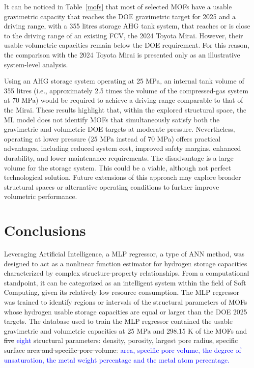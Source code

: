 \documentclass[review]{elsarticle}
\begin{document}
It can be noticed in Table~\ref{mofs} that most of selected MOFs have 
a usable gravimetric capacity that reaches the DOE gravimetric target 
for 2025 and a driving range, with a 355 litres storage AHG tank system, 
that reaches or is close to the driving range of an existing FCV, the 2024 
Toyota Mirai. However, their usable volumetric capacities remain below the 
DOE requirement. For this reason, the comparison with the 2024 Toyota Mirai 
is presented only as an illustrative system-level analysis. 
 
Using an AHG storage system operating at 25 MPa, an internal tank volume of 355 
litres (i.e., approximately 2.5 times the volume of the compressed-gas system 
at 70 MPa) would be required to achieve a driving range comparable to that 
of the Mirai.  These results highlight that, within the explored structural 
space, the ML model does not identify MOFs that simultaneously satisfy both the 
gravimetric and volumetric DOE targets at moderate pressure. Nevertheless, 
operating at lower pressure (25 MPa instead of 70 MPa) offers practical 
advantages, including reduced system cost, improved safety margins, enhanced 
durability, and lower maintenance requirements. The disadvantage is a large 
volume for the storage system. This could be a viable, although not perfect 
technological solution. Future extensions of this approach may explore 
broader structural spaces or alternative operating conditions to further 
improve volumetric performance. 



\section{Conclusions}

Leveraging Artificial Intelligence, a MLP regressor, a type of ANN method, was 
designed to act as a nonlinear function estimator for hydrogen storage 
capacities characterized by complex structure-property relationships. From a 
computational standpoint, it can be categorized as an intelligent system within 
the field of Soft Computing, given its relatively low resource consumption. 
The MLP regressor was trained to identify regions or intervals of the 
structural parameters of MOFs whose hydrogen usable storage capacities are 
equal or larger than the DOE 2025 targets. The database used to train the 
MLP regressor contained the usable gravimetric and volumetric capacities 
at 25 MPa and 298.15 K of the MOFs and \sout{five} \textcolor{blue}{eight} 
structural parameters: density, porosity, largest pore radius, specific surface 
\sout{area and specific pore volume.} \textcolor{blue}{area, specific pore 
volume, the degree of unsaturation, the metal weight percentage and the metal 
atom percentage.}
 
\end{document}
